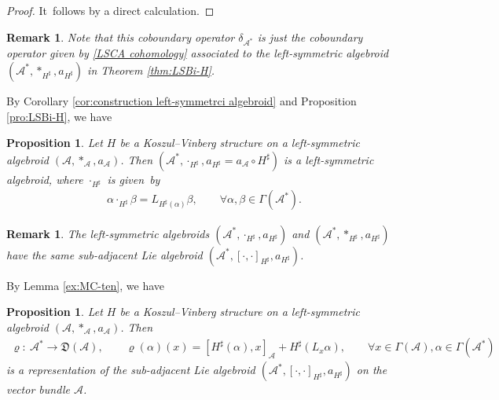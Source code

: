 \documentclass[pdftex]{sigma}%
\numberwithin{equation}{section}
\newtheorem{pro}[thm]{Proposition}
\newtheorem{rmk}[thm]{Remark}
\newcommand{\huaA}{\mathcal{A}}
\newcommand{\frkD}{\mathfrak D}
\begin{document}
\begin{proof}
 It~follows by a direct calculation.
\end{proof}
\begin{rmk}
 Note that this coboundary operator $\delta_{\huaA^*}$ is just the coboundary operator given by \eqref{LSCA cohomology} associated to the left-symmetric algebroid $(\huaA^*,\ast_{H^\sharp},a_{H^\sharp})$ in Theorem \ref{thm:LSBi-H}.
\end{rmk}



By Corollary \ref{cor:construction left-symmetrci algebroid} and Proposition \ref{pro:LSBi-H}, we have
\begin{pro}
 {\sloppy Let $H$ be a Koszul--Vinberg structure on a left-symmetric algebroid $(\huaA,\ast_\huaA,a_\huaA)$. Then $(\huaA^*,\cdot_{H^\sharp},a_{H^\sharp}=a_\huaA\circ H^\sharp)$ is a left-symmetric algebroid, where $\cdot_{H^\sharp}$ is given~by
 \begin{gather*}
 \alpha\cdot_{H^\sharp}\beta=L_{H^\sharp(\alpha)}\beta,\qquad
 \forall \alpha,\beta\in\Gamma(\huaA^*).
 \end{gather*}}
\end{pro}

\begin{rmk}
 The left-symmetric algebroids $(\huaA^*,\cdot_{H^\sharp},a_{H^\sharp})$ and $(\huaA^*,\ast_{H^\sharp},a_{H^\sharp})$ have the same sub-adjacent Lie algebroid $(\huaA^*,[\cdot,\cdot]_{H^\sharp},a_{H^\sharp})$.
\end{rmk}



By Lemma \ref{ex:MC-ten}, we have
\begin{pro}%
{\sloppy Let $H$ be a Koszul--Vinberg structure on a left-symmetric algebroid $(\huaA,\ast_\huaA,a_\huaA)$.
 Then
 \begin{gather}\label{eq:rep-coadjoint}
\varrho\colon\ \huaA^*\longrightarrow \frkD(\huaA),\qquad \varrho(\alpha)(x)=[H^\sharp(\alpha),x]_{\huaA}+H^\sharp(L_x\alpha ),\qquad \forall x\in\Gamma{(\huaA)},\alpha\in\Gamma(\huaA^*)
\end{gather}}\noindent
 is a representation of the sub-adjacent Lie algebroid $(\huaA^*,[\cdot,\cdot]_{H^\sharp},a_{H^\sharp})$ on the vector bundle $\huaA$.
\end{pro}
\end{document}
